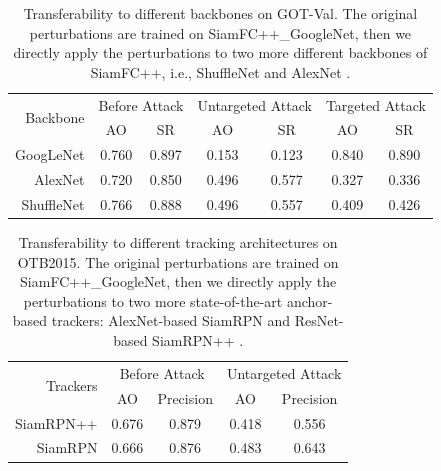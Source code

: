 \documentclass[journal]{IEEEtran}
\newcommand{\ie}{i.e.}
\begin{document}
\begin{table}[t]
  \centering
  \caption{Transferability to different backbones on GOT-Val. The original perturbations are trained on SiamFC++\_GoogleNet, then we directly apply the perturbations to two more different backbones of SiamFC++, \ie, ShuffleNet \cite{ShuffleNet} and AlexNet \cite{AlexNet}.}
  \begin{tabular}{rcccccc} 
  \toprule
  \multirow{2}{*}[-2pt]{Backbone} & \multicolumn{2}{c}{Before Attack} & \multicolumn{2}{c}{Untargeted Attack} & \multicolumn{2}{c}{Targeted Attack}  \\ 
  \cmidrule{2-7}
                            & AO    & SR                           & AO    & SR                           & AO    & SR                           \\ 
  \midrule
  GoogLeNet                 & 0.760 & 0.897                        & 0.153 & 0.123                        & 0.840 & 0.890                        \\
  AlexNet                   & 0.720 & 0.850                        & 0.496 & 0.577                        & 0.327 & 0.336                        \\
  ShuffleNet                & 0.766 & 0.888                        & 0.496 & 0.557                        & 0.409 & 0.426                       \\
  \bottomrule
  \end{tabular}
  \label{tab:backbone}
\end{table}
\begin{table}[t!]
  \centering
  \caption{Transferability to different tracking architectures on OTB2015. The original perturbations are trained on SiamFC++\_GoogleNet, then we directly apply the perturbations to two more state-of-the-art anchor-based trackers: AlexNet-based SiamRPN \cite{SiamRPN} and ResNet-based SiamRPN++ \cite{SiamRPN++}.}
  \begin{tabular}{rcccc} 
  \toprule
  \multirow{2}{*}[-2pt]{Trackers} & \multicolumn{2}{c}{Before Attack} & \multicolumn{2}{c}{Untargeted Attack}  \\
  \cmidrule{2-5}
                            & AO & Precision              & AO & Precision                   \\
  \midrule
  SiamRPN++                 & 0.676   & 0.879                  & 0.418   & 0.556                       \\
  SiamRPN                   & 0.666   & 0.876                  & 0.483   & 0.643                       \\
  \bottomrule
  \end{tabular}
  \label{tab:arch}
\end{table}
\end{document}
